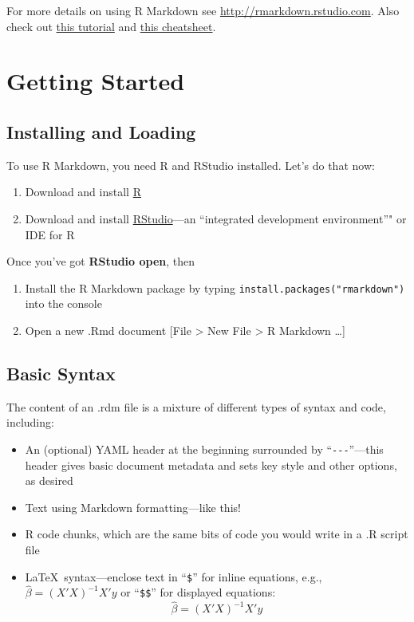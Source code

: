 \documentclass[11pt,]{article}
\providecommand{\tightlist}{%
  \setlength{\itemsep}{0pt}\setlength{\parskip}{0pt}}
\begin{document}
For more details on using R Markdown see
\url{http://rmarkdown.rstudio.com}. Also check out
\href{http://rmarkdown.rstudio.com/lesson-1.html}{this tutorial} and
\href{https://www.rstudio.com/wp-content/uploads/2016/03/rmarkdown-cheatsheet-2.0.pdf}{this
cheatsheet}.

\section{Getting Started}\label{getting-started}

\subsection{Installing and Loading}\label{installing-and-loading}

To use R Markdown, you need R and RStudio installed. Let's do that now:

\begin{enumerate}
\def\labelenumi{\arabic{enumi}.}
\tightlist
\item
  Download and install \href{https://cran.rstudio.com/}{R}
\item
  Download and install
  \href{https://www.rstudio.com/products/rstudio/download/}{RStudio}---an
  ``integrated development environment''" or IDE for R
\end{enumerate}

Once you've got \textbf{RStudio open}, then

\begin{enumerate}
\def\labelenumi{\arabic{enumi}.}
\setcounter{enumi}{2}
\tightlist
\item
  Install the R Markdown package by typing
  \texttt{install.packages("rmarkdown")} into the console
\item
  Open a new .Rmd document {[}File \textgreater{} New File
  \textgreater{} R Markdown \ldots{}{]}
\end{enumerate}

\subsection{Basic Syntax}\label{basic-syntax}

The content of an .rdm file is a mixture of different types of syntax
and code, including:

\begin{itemize}
\tightlist
\item
  An (optional) YAML header at the beginning surrounded by
  ``\texttt{-\/-\/-}''---this header gives basic document metadata and
  sets key style and other options, as desired
\item
  Text using Markdown formatting---like this!
\item
  R code chunks, which are the same bits of code you would write in a .R
  script file
\item
  \LaTeX~syntax---enclose text in ``\texttt{\$}'' for inline equations,
  e.g., \(\hat \beta = (X'X)^{-1}X'y\) or ``\texttt{\$\$}'' for
  displayed equations: \[\hat \beta = (X'X)^{-1}X'y \]
\end{itemize}
\end{document}
